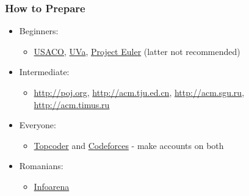 \documentclass[svgnames,dvipsnames,usenames]{beamer}
\begin{document}
\begin{frame}
    \frametitle{How to Prepare}
    \begin{itemize}
            \pause
        \item Beginners:
            \begin{itemize}
                    \pause
                \item \href{http://train.usaco.org/usacogate}{USACO}, \href{http://uva.onlinejudge.org/}{UVa}, \href{http://projecteuler.com}{Project Euler} (latter not recommended)
            \end{itemize}
            \pause
        \item Intermediate:
            \begin{itemize}
                    \pause
                \item \url{http://poj.org}, \url{http://acm.tju.ed.cn}, \url{http://acm.sgu.ru}, \url{http://acm.timus.ru} 
            \end{itemize}
            \pause
        \item Everyone:
            \begin{itemize}
                    \pause
                \item \href{http://topcoder.com/tc}{Topcoder} and \href{http://codeforces.com}{Codeforces} - make accounts on both
            \end{itemize}
            \pause
        \item Romanians:
            \begin{itemize}
                    \pause
                \item \href{http://infoarena.ro}{Infoarena}
            \end{itemize}
    \end{itemize}
\end{frame}
\end{document}
